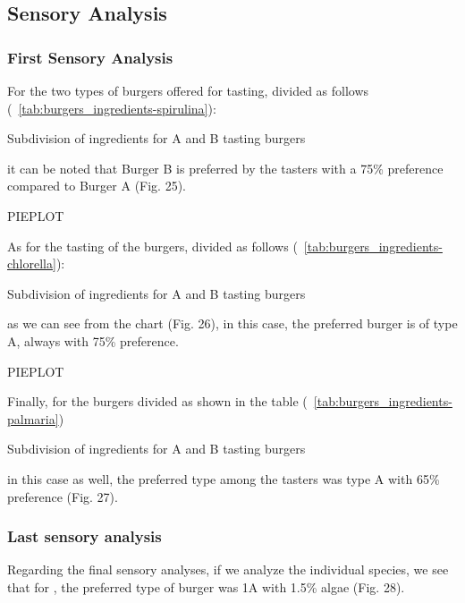 \subsection{Sensory Analysis}
\subsubsection{First Sensory Analysis}
For the two types of  burgers offered for tasting, divided as follows (\tab{}~\ref{tab:burgers_ingredients-spirulina}):
\begin{table}[H]
	\caption{Subdivision of ingredients for  A and B tasting burgers}
	\label{tab:burgers_ingredients-spirulina}
	\centering
	
\end{table}

it can be noted that Burger B is preferred by the tasters with a 75\% preference compared to Burger A (Fig. 25).

PIEPLOT

As for the tasting of the  burgers, divided as follows (\tab{}~\ref{tab:burgers_ingredients-chlorella}):
\begin{table}[H]
	\caption{Subdivision of ingredients for  A and B tasting burgers}
	\label{tab:burgers_ingredients-chlorella}
	\centering
	
\end{table}

as we can see from the chart (Fig. 26), in this case, the preferred burger is of type A, always with 75\% preference.

PIEPLOT

Finally, for the  burgers divided as shown in the table (\tab{}~\ref{tab:burgers_ingredients-palmaria})
\begin{table}[H]
	\caption{Subdivision of ingredients for  A and B tasting burgers}
	\label{tab:burgers_ingredients-palmaria}
	\centering
	
\end{table}

in this case as well, the preferred type among the tasters was type A with 65\% preference (Fig. 27).

\subsubsection{Last sensory analysis}
Regarding the final sensory analyses, if we analyze the individual species, we see that for , the preferred type of burger was 1A with 1.5\% algae (Fig. 28).

